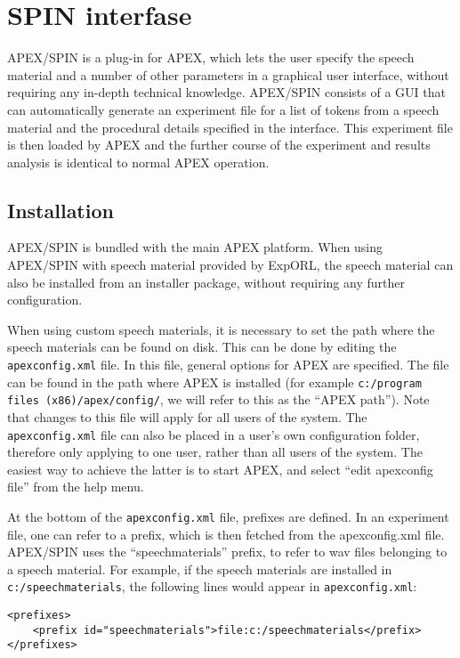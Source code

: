 \chapter{SPIN interfase}
\label{chap:SPIN}

APEX/SPIN is a plug-in for APEX, which lets the user specify the speech material and a number
of other parameters in a graphical user interface, without
requiring any in-depth technical knowledge. APEX/SPIN
consists of a GUI that can automatically generate an experiment file for
a list of tokens from a speech material and the procedural details
specified in the interface. This experiment file is then loaded by APEX
and the further course of the experiment and results analysis is
identical to normal APEX operation.

\section{Installation}
\label{sec:Installation}

APEX/SPIN is bundled with the main APEX platform. When using APEX/SPIN
with speech material provided by ExpORL, the speech material can also
be installed from an installer package, without requiring any further
configuration.

When using custom speech materials, it is necessary to set the path
where the speech materials can be found on disk. This can be done by
editing the \texttt{apexconfig.xml} file. In this file, general options
for APEX are specified. The file can be found in the path where APEX is
installed (for example \texttt{c:/program files (x86)/apex/config/}, we will
refer to this as the ``APEX path''). Note that changes to this file will
apply for all users of the system. The \texttt{apexconfig.xml} file can
also be placed in a user's own configuration folder, therefore only
applying to one user, rather than all users of the system. The easiest
way to achieve the latter is to start APEX, and select ``edit apexconfig
file'' from the help menu.

At the bottom of the \texttt{apexconfig.xml} file, prefixes are defined.
In an experiment file, one can refer to a prefix, which is then fetched
from the apexconfig.xml file. APEX/SPIN uses the ``speechmaterials''
prefix, to refer to wav files belonging to a speech material. For example, if
the speech materials are installed in \texttt{c:/speechmaterials}, the
following lines would appear in \texttt{apexconfig.xml}:

\begin{lstlisting}[caption=Specifying a prefix]
<prefixes>
    <prefix id="speechmaterials">file:c:/speechmaterials</prefix>
</prefixes>
\end{lstlisting}

